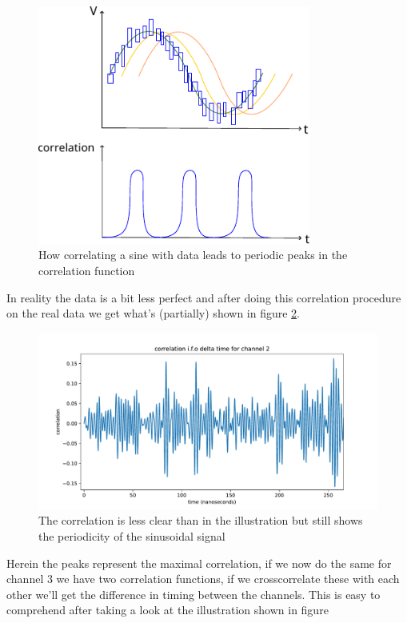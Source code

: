 \begin{figure}
	\centering
	\includegraphics[width=0.8\textwidth]{figures/SineDataCorrFull.pdf}
	\caption{How correlating a sine with data leads to periodic peaks in the correlation function}
	\label{fig:SineCorrFull}
\end{figure}
In reality the data is a bit less perfect and after doing this correlation
procedure on the real data we get what's (partially) shown in figure \ref{fig:CorrCh2}.
\begin{figure}
	\centering
	\includegraphics[width=\textwidth]{figures/CorrelationCh2.pdf}
	\caption{The correlation is less clear than in the illustration but still shows the periodicity of the sinusoidal signal}
	\label{fig:CorrCh2}
\end{figure}
Herein the peaks represent the maximal correlation, if we now do the same for
channel 3 we have two correlation functions, if we crosscorrelate these with
each other we'll get the difference in timing between the channels.  This is
easy to comprehend after taking a look at the illustration shown in figure
